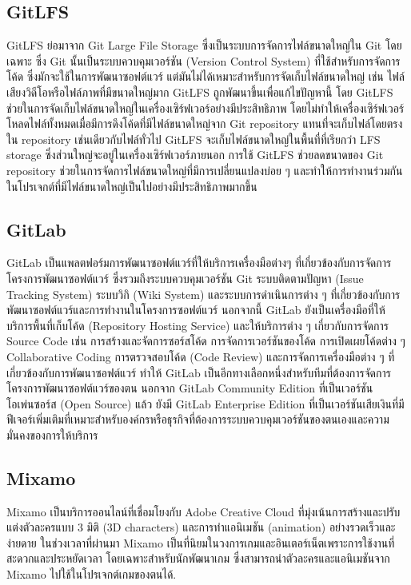\subsection{GitLFS}
GitLFS ย่อมาจาก Git Large File Storage ซึ่งเป็นระบบการจัดการไฟล์ขนาดใหญ่ใน Git โดยเฉพาะ ซึ่ง Git นั้นเป็นระบบควบคุมเวอร์ชัน (Version Control System) ที่ใช้สำหรับการจัดการโค้ด ซึ่งมักจะใช้ในการพัฒนาซอฟต์แวร์ แต่มันไม่ได้เหมาะสำหรับการจัดเก็บไฟล์ขนาดใหญ่ เช่น ไฟล์เสียงวิดีโอหรือไฟล์ภาพที่มีขนาดใหญ่มาก
GitLFS ถูกพัฒนาขึ้นเพื่อแก้ไขปัญหานี้ โดย GitLFS ช่วยในการจัดเก็บไฟล์ขนาดใหญ่ในเครื่องเซิร์ฟเวอร์อย่างมีประสิทธิภาพ โดยไม่ทำให้เครื่องเซิร์ฟเวอร์โหลดไฟล์ทั้งหมดเมื่อมีการดึงโค้ดที่มีไฟล์ขนาดใหญ่จาก Git repository แทนที่จะเก็บไฟล์โดยตรงใน repository เช่นเดียวกับไฟล์ทั่วไป GitLFS จะเก็บไฟล์ขนาดใหญ่ในพื้นที่ที่เรียกว่า LFS storage ซึ่งส่วนใหญ่จะอยู่ในเครื่องเซิร์ฟเวอร์ภายนอก
การใช้ GitLFS ช่วยลดขนาดของ Git repository ช่วยในการจัดการไฟล์ขนาดใหญ่ที่มีการเปลี่ยนแปลงบ่อย ๆ และทำให้การทำงานร่วมกันในโปรเจกต์ที่มีไฟล์ขนาดใหญ่เป็นไปอย่างมีประสิทธิภาพมากขึ้น

\subsection{GitLab}
GitLab เป็นแพลตฟอร์มการพัฒนาซอฟต์แวร์ที่ให้บริการเครื่องมือต่างๆ ที่เกี่ยวข้องกับการจัดการโครงการพัฒนาซอฟต์แวร์ ซึ่งรวมถึงระบบควบคุมเวอร์ชัน Git ระบบติดตามปัญหา (Issue Tracking System) ระบบวิกิ (Wiki System) และระบบการดำเนินการต่าง ๆ ที่เกี่ยวข้องกับการพัฒนาซอฟต์แวร์และการทำงานในโครงการซอฟต์แวร์
นอกจากนี้ GitLab ยังเป็นเครื่องมือที่ให้บริการพื้นที่เก็บโค้ด (Repository Hosting Service) และให้บริการต่าง ๆ เกี่ยวกับการจัดการ Source Code เช่น การสร้างและจัดการซอร์สโค้ด การจัดการเวอร์ชันของโค้ด การเปิดเผยโค้ดต่าง ๆ Collaborative Coding การตรวจสอบโค้ด (Code Review) และการจัดการเครื่องมือต่าง ๆ ที่เกี่ยวข้องกับการพัฒนาซอฟต์แวร์ ทำให้ GitLab เป็นอีกทางเลือกหนึ่งสำหรับทีมที่ต้องการจัดการโครงการพัฒนาซอฟต์แวร์ของตน
นอกจาก GitLab Community Edition ที่เป็นเวอร์ชันโอเพ่นซอร์ส (Open Source) แล้ว ยังมี GitLab Enterprise Edition ที่เป็นเวอร์ชันเสียเงินที่มีฟีเจอร์เพิ่มเติมที่เหมาะสำหรับองค์กรหรือธุรกิจที่ต้องการระบบควบคุมเวอร์ชันของตนเองและความมั่นคงของการให้บริการ

\subsection{Mixamo}
Mixamo เป็นบริการออนไลน์ที่เชื่อมโยงกับ Adobe Creative Cloud ที่มุ่งเน้นการสร้างและปรับแต่งตัวละครแบบ 3 มิติ (3D characters) และการทำแอนิเมชัน (animation) อย่างรวดเร็วและง่ายดาย ในช่วงเวลาที่ผ่านมา Mixamo เป็นที่นิยมในวงการเกมและอินเตอร์เน็ตเพราะการใช้งานที่สะดวกและประหยัดเวลา โดยเฉพาะสำหรับนักพัฒนาเกม ซึ่งสามารถนำตัวละครและแอนิเมชันจาก Mixamo ไปใช้ในโปรเจกต์เกมของตนได้.

